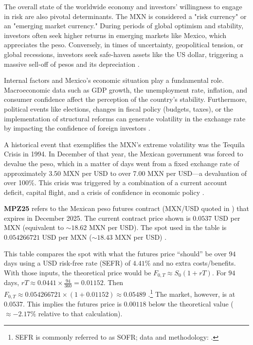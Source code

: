 \documentclass[10pt,a4paper]{article} %
\begin{document}
The overall state of the worldwide economy and investors' willingness to engage in risk are also pivotal determinants. The MXN is considered a "risk currency" or an "emerging market currency." During periods of global optimism and stability, investors often seek higher returns in emerging markets like Mexico, which appreciates the peso. Conversely, in times of uncertainty, geopolitical tension, or global recessions, investors seek safe-haven assets like the US dollar, triggering a massive sell-off of pesos and its depreciation \citep{bis_eme_internationalisation_2022}.

Internal factors and Mexico's economic situation play a fundamental role. Macroeconomic data such as GDP growth, the unemployment rate, inflation, and consumer confidence affect the perception of the country's stability. Furthermore, political events like elections, changes in fiscal policy (budgets, taxes), or the implementation of structural reforms can generate volatility in the exchange rate by impacting the confidence of foreign investors \citep{banxico_regional_2024}.

A historical event that exemplifies the MXN's extreme volatility was the Tequila Crisis in 1994. In December of that year, the Mexican government was forced to devalue the peso, which in a matter of days went from a fixed exchange rate of approximately 3.50 MXN per USD to over 7.00 MXN per USD—a devaluation of over 100\%. This crisis was triggered by a combination of a current account deficit, capital flight, and a crisis of confidence in economic policy \citep{imf_tequila_2012,yale_tequila_2012}.


\textbf{MPZ25} refers to the Mexican peso futures contract (MXN/USD quoted in ) that expires in December 2025. The current contract price shown is \(0.0537\) USD per MXN (equivalent to \(\sim 18.62\) MXN per USD). The spot used in the table is \(0.054266721\) USD per MXN (\(\sim 18.43\) MXN per USD) \citep{cme_mxn_product,cme_mxn_rulebook}.

This table compares the spot with what the futures price “should” be over \(94\) days using a USD risk-free rate (SEFR) of \(4.41\%\) and no extra costs/benefits. With those inputs, the theoretical price would be \(F_{0,T} \approx S_0(1+rT)\). For \(94\) days, \(rT \approx 0.0441 \times \frac{94}{360} = 0.01152\). Then \(F_{0,T} \approx 0.054266721 \times (1+0.01152) \approx \mathbf{0.05489}\) \citep{frbny_sofr}.\footnote{SEFR is commonly referred to as SOFR; data and methodology: \citep{frbny_sofr,frbny_sofr_index}.}
The market, however, is at \(0.0537\). This implies the futures price is \(0.00118\) below the theoretical value (\(\approx -2.17\%\) relative to that calculation).
\end{document}
